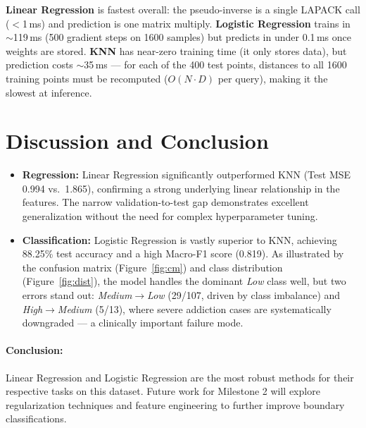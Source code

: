 \documentclass[10pt, twocolumn, letterpaper]{article}
\begin{document}
\noindent \textbf{Linear Regression} is fastest overall: the pseudo-inverse is a single LAPACK call ($<$1\,ms) and prediction is one matrix multiply. \textbf{Logistic Regression} trains in $\sim$119\,ms (500 gradient steps on 1600 samples) but predicts in under 0.1\,ms once weights are stored. \textbf{KNN} has near-zero training time (it only stores data), but prediction costs $\sim$35\,ms — for each of the 400 test points, distances to all 1600 training points must be recomputed ($O(N \cdot D)$ per query), making it the slowest at inference.

\section{Discussion and Conclusion}
\begin{itemize}[leftmargin=*]
    \item \textbf{Regression:} Linear Regression significantly outperformed KNN (Test MSE 0.994 vs.\ 1.865), confirming a strong underlying linear relationship in the features. The narrow validation-to-test gap demonstrates excellent generalization without the need for complex hyperparameter tuning.
    \item \textbf{Classification:} Logistic Regression is vastly superior to KNN, achieving 88.25\% test accuracy and a high Macro-F1 score (0.819). As illustrated by the confusion matrix (Figure~\ref{fig:cm}) and class distribution (Figure~\ref{fig:dist}), the model handles the dominant \emph{Low} class well, but two errors stand out: \emph{Medium}$\to$\emph{Low} (29/107, driven by class imbalance) and \emph{High}$\to$\emph{Medium} (5/13), where severe addiction cases are systematically downgraded — a clinically important failure mode.
\end{itemize}

\paragraph{Conclusion:} Linear Regression and Logistic Regression are the most robust methods for their respective tasks on this dataset. Future work for Milestone 2 will explore regularization techniques and feature engineering to further improve boundary classifications.
\end{document}
